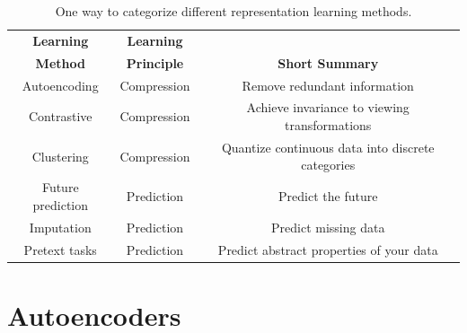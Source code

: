 \begin{table}[]
    \caption{One way to categorize different representation learning methods.} %
    \begin{center}
    \begin{tabular}{ccc}
        \toprule
        \textbf{Learning} & \textbf{Learning} & \\
        \textbf{Method} & \textbf{Principle} & \textbf{Short Summary} \\
        \midrule
        Autoencoding & Compression & Remove redundant information \\
        Contrastive & Compression & Achieve invariance to viewing transformations \\
        Clustering & Compression & Quantize continuous data into discrete categories \\
        Future prediction & Prediction & Predict the future \\
        Imputation & Prediction & Predict missing data \\
        Pretext tasks & Prediction & Predict abstract properties of your data \\
        \bottomrule
    \end{tabular}
    \end{center}
    \label{tab:representation_learning:types_of_representation_learners}
\end{table}


\section{Autoencoders}\label{sec:representation_learning:autoencoders}

